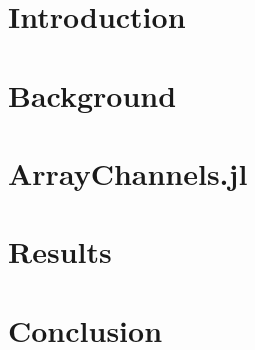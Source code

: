 \documentclass{juliacon}
\begin{document}


\maketitle

\begin{abstract}

\end{abstract}

\section{Introduction}


\section{Background}


\section{ArrayChannels.jl}


\section{Results}


\section{Conclusion}



\end{document}
